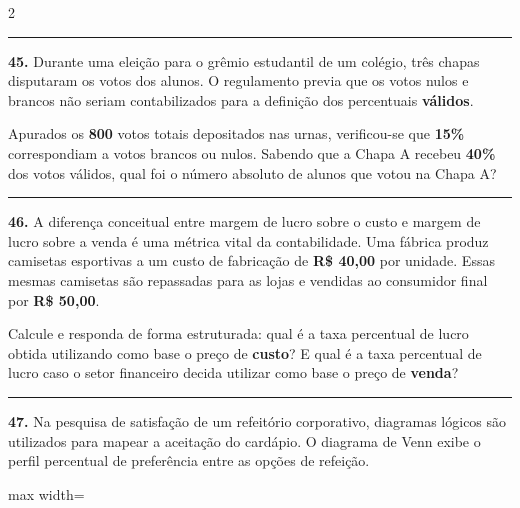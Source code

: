 \documentclass[twoside, 10pt, a4paper]{article}
\newlength{\espacoPreQuestao}
\newlength{\espacoQuestao}
\begin{document}
\begin{multicols*}{2}
\noindent\textcolor{CorLinha}{\rule{\linewidth}{0.5pt}} 
\par\vspace{\espacoPreQuestao}
\textbf{45.} Durante uma eleição para o grêmio estudantil de um colégio, três chapas disputaram os votos dos alunos. O regulamento previa que os votos nulos e brancos não seriam contabilizados para a definição dos percentuais \textbf{válidos}. 

Apurados os \textbf{800} votos totais depositados nas urnas, verificou-se que \textbf{15\%} correspondiam a votos brancos ou nulos. Sabendo que a Chapa A recebeu \textbf{40\%} dos votos válidos, qual foi o número absoluto de alunos que votou na Chapa A?
\par\vspace{\espacoQuestao}

\noindent\textcolor{CorLinha}{\rule{\linewidth}{0.5pt}} 
\par\vspace{\espacoPreQuestao}
\textbf{46.} A diferença conceitual entre margem de lucro sobre o custo e margem de lucro sobre a venda é uma métrica vital da contabilidade. Uma fábrica produz camisetas esportivas a um custo de fabricação de \textbf{R\$ 40,00} por unidade. Essas mesmas camisetas são repassadas para as lojas e vendidas ao consumidor final por \textbf{R\$ 50,00}.

Calcule e responda de forma estruturada: qual é a taxa percentual de lucro obtida utilizando como base o preço de \textbf{custo}? E qual é a taxa percentual de lucro caso o setor financeiro decida utilizar como base o preço de \textbf{venda}?
\par\vspace{\espacoQuestao}

\noindent\textcolor{CorLinha}{\rule{\linewidth}{0.5pt}} 
\par\vspace{\espacoPreQuestao}
\textbf{47.} Na pesquisa de satisfação de um refeitório corporativo, diagramas lógicos são utilizados para mapear a aceitação do cardápio. O diagrama de Venn exibe o perfil percentual de preferência entre as opções de refeição.

\begin{center}
\begin{adjustbox}{max width=\linewidth}
\end{adjustbox}
\end{center}
\end{multicols*}
\end{document}

